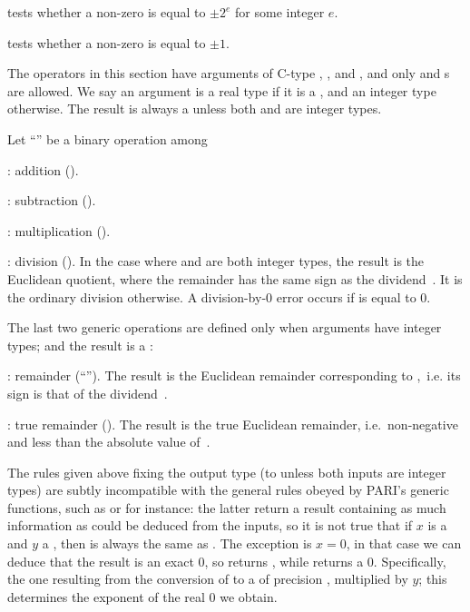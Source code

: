  tests whether a non-zero  
is equal to $\pm 2^e$ for some integer $e$.

 tests whether a non-zero  
is equal to $\pm 1$.

\label{se:genbinop} The operators in this
section have arguments of C-type , , and , and
only  and  s are allowed. We say an argument is a
real type if it is a  , and an integer type otherwise. The
result is always a  unless both  and  are integer
types.

Let ``\op'' be a binary operation among

\item {}: addition ().

\item {}: subtraction ().

\item {}: multiplication ().

\item {}: division (). In the case where  and 
are both integer types, the result is the Euclidean quotient, where the
remainder has the same sign as the dividend~. It is the ordinary
division otherwise. A division-by-$0$ error occurs if  is equal to
$0$.

The last two generic operations are defined only when arguments have integer
types; and the result is a :

\item {}: remainder (``''). The result is the Euclidean
remainder corresponding to ,~i.e. its sign is that of the
dividend~.

\item {}: true remainder (). The result is the true
Euclidean remainder, i.e.~non-negative and less than the absolute value
of~.

 The rules given above fixing the output
type (to  unless both inputs are integer types) are subtly
incompatible with the general rules obeyed by PARI's generic functions, such
as  or  for instance: the latter return a result
containing as much information as could be deduced from the inputs, so it is
not true that if $x$ is a  and $y$ a , then
 is always the same as . The exception
is $x = 0$, in that case we can deduce that the result is an exact $0$,
so  returns , while  returns a
 $0$. Specifically, the one resulting from the conversion of
 to a  of precision , multiplied by
$y$; this determines the exponent of the real $0$ we obtain.


